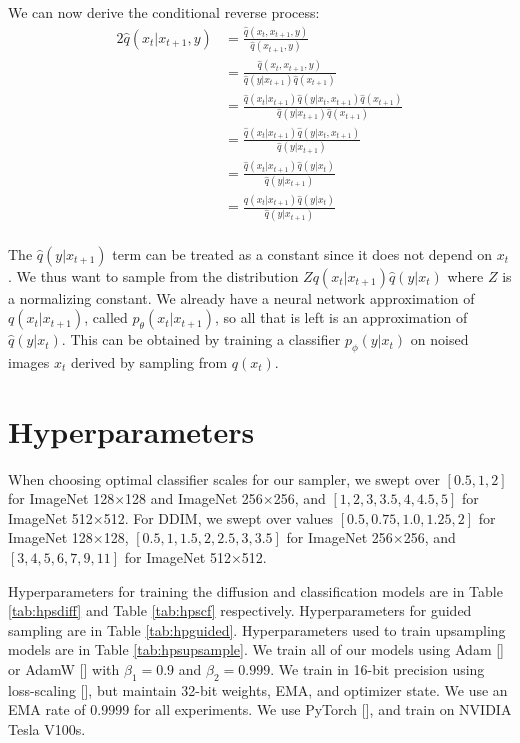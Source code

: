 \documentclass{article}
\newcommand{\shortcite}[1]{[\citenum{#1}]}
\begin{document}
We can now derive the conditional reverse process:
%
\begin{alignat}{2}
\hat{q}(x_t|x_{t+1},y) &= \frac{\hat{q}(x_t,x_{t+1},y)}{\hat{q}(x_{t+1},y)} \\
                 &= \frac{\hat{q}(x_t,x_{t+1},y)}{\hat{q}(y|x_{t+1})\hat{q}(x_{t+1})} \\
                 &= \frac{\hat{q}(x_t|x_{t+1})\hat{q}(y|x_t,x_{t+1})\hat{q}(x_{t+1})}{\hat{q}(y|x_{t+1})\hat{q}(x_{t+1})} \\
                 &= \frac{\hat{q}(x_t|x_{t+1})\hat{q}(y|x_t,x_{t+1})}{\hat{q}(y|x_{t+1})} \\
                 &= \frac{\hat{q}(x_t|x_{t+1})\hat{q}(y|x_t)}{\hat{q}(y|x_{t+1})} \\
                 &= \frac{q(x_t|x_{t+1})\hat{q}(y|x_t)}{\hat{q}(y|x_{t+1})} \\
\end{alignat}

The $\hat{q}(y|x_{t+1})$ term can be treated as a constant since it does not depend on $x_t$. We thus want to sample from the distribution $Z q(x_t|x_{t+1})\hat{q}(y|x_t)$ where $Z$ is a normalizing constant. We already have a neural network approximation of $q(x_t|x_{t+1})$, called $p_{\theta}(x_t|x_{t+1})$, so all that is left is an approximation of $\hat{q}(y|x_t)$. This can be obtained by training a classifier $p_{\phi}(y|x_t)$ on noised images $x_t$ derived by sampling from $q(x_t)$.

\clearpage
\section{Hyperparameters}
\label{app:hyperparameters}

When choosing optimal classifier scales for our sampler, we swept over $[0.5, 1, 2]$ for ImageNet 128$\times$128 and ImageNet 256$\times$256, and $[1, 2, 3, 3.5, 4, 4.5, 5]$ for ImageNet 512$\times$512. For DDIM, we swept over values $[0.5, 0.75, 1.0, 1.25, 2]$ for ImageNet 128$\times$128, $[0.5, 1, 1.5, 2, 2.5, 3, 3.5]$ for ImageNet 256$\times$256, and $[3,4,5,6,7,9,11]$ for ImageNet 512$\times$512.

Hyperparameters for training the diffusion and classification models are in Table \ref{tab:hpsdiff} and Table \ref{tab:hpscf} respectively. Hyperparameters for guided sampling are in Table \ref{tab:hpguided}. Hyperparameters used to train upsampling models are in Table \ref{tab:hpsupsample}. We train all of our models using Adam \shortcite{adam} or AdamW \shortcite{adamw} with $\beta_1=0.9$ and $\beta_2=0.999$. We train in 16-bit precision using loss-scaling \shortcite{lossscaling}, but maintain 32-bit weights, EMA, and optimizer state. We use an EMA rate of 0.9999 for all experiments. We use PyTorch \shortcite{pytorch}, and train on NVIDIA Tesla V100s.
\end{document}
